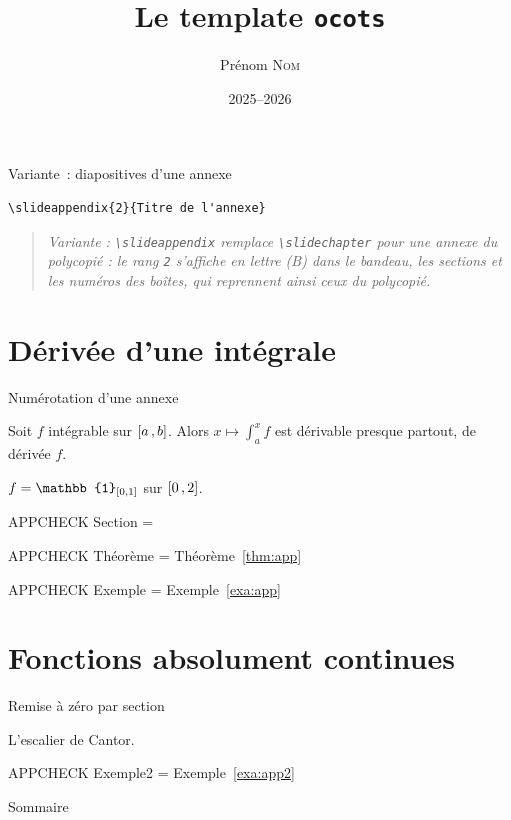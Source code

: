 \documentclass[9pt,t]{beamer}
\title{Le template \texttt{ocots}}
\author{Prénom \textsc{Nom}}
\date{2025--2026}
\newcommand{\ocotsvariantnote}[1]{\begin{quote}\itshape Variante : #1\end{quote}}
\begin{document}
\begin{frame}[fragile]{Variante~: diapositives d'une annexe}
\begin{lstlisting}
\slideappendix{2}{Titre de l'annexe}
\end{lstlisting}
\ocotsvariantnote{\texttt{\textbackslash slideappendix} remplace
\texttt{\textbackslash slidechapter} pour une annexe du polycopié : le rang
\texttt{2} s'affiche en lettre (B) dans le bandeau, les sections et les
numéros des boîtes, qui reprennent ainsi ceux du polycopié.}
\end{frame}

\slidetitlepage

\section{Dérivée d'une intégrale}

\begin{slide}{Numérotation d'une annexe}

\begin{theorem}[title={de dérivation de Lebesgue}, label=thm:app]
    Soit $f$ intégrable sur $\mathopen{[}a\mathclose{}\mathpunct{},b\mathclose{]}$. Alors $x \mapsto \int_a^x f$ est dérivable presque partout, de
    dérivée $f$.
\end{theorem}

\begin{example}[label=exa:app]
    $f = \mathbb{1}_{\intervalcc{0}{1}}$ sur $\mathopen{[}0\mathclose{}\mathpunct{},2\mathclose{]}$.
\end{example}

APPCHECK Section = \thesection

APPCHECK Théorème = Théorème~\ref{thm:app}

APPCHECK Exemple = Exemple~\ref{exa:app}

\end{slide}

\section{Fonctions absolument continues}

\begin{slide}{Remise à zéro par section}

\begin{example}[label=exa:app2]
    L'escalier de Cantor.
\end{example}

APPCHECK Exemple2 = Exemple~\ref{exa:app2}

\end{slide}

\begin{frame}{Sommaire}
\tableofcontents
\end{frame}
\end{document}
